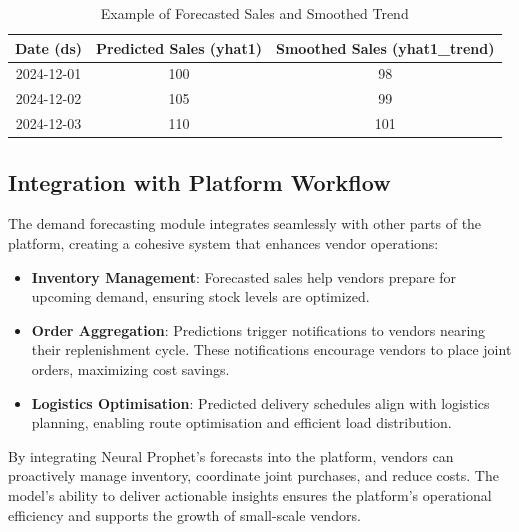 \begin{table}[h!]
    \centering
    \begin{tabular}{|c|c|c|}
        \hline
        \textbf{Date (ds)} & \textbf{Predicted Sales (yhat1)} & \textbf{Smoothed Sales (yhat1\_trend)} \\
        \hline
        2024-12-01         & 100                              & 98                                     \\
        2024-12-02         & 105                              & 99                                     \\
        2024-12-03         & 110                              & 101                                    \\
        \hline
    \end{tabular}
    \caption{Example of Forecasted Sales and Smoothed Trend}
\end{table}

\subsection{Integration with Platform Workflow}

The demand forecasting module integrates seamlessly with other parts of the platform, creating a cohesive system that enhances vendor operations:

\begin{itemize}
    \item \textbf{Inventory Management}: Forecasted sales help vendors prepare for upcoming demand, ensuring stock levels are optimized.
    \item \textbf{Order Aggregation}: Predictions trigger notifications to vendors nearing their replenishment cycle. These notifications encourage vendors to place joint orders, maximizing cost savings.
    \item \textbf{Logistics Optimisation}: Predicted delivery schedules align with logistics planning, enabling route optimisation and efficient load distribution.
\end{itemize}
By integrating Neural Prophet’s forecasts into the platform, vendors can proactively manage inventory, coordinate joint purchases, and reduce costs. The model’s ability to deliver actionable insights ensures the platform’s operational efficiency and supports the growth of small-scale vendors.